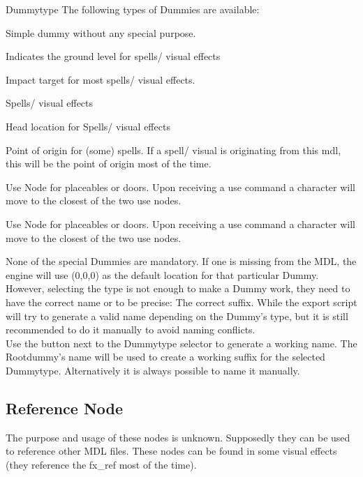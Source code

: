 \begin{propertyAurora}{Dummytype}
The following types of Dummies are available:
\begin{description}[leftmargin=6em,style=nextline]
    \item[None] Simple dummy without any special purpose.
    \item[Ground] Indicates the ground level for spells/ visual effects
    \item[Impact] Impact target for most spells/ visual effects.
    \item[Head Hit] Spells/ visual effects
    \item[Head] Head location for Spells/ visual effects
    \item[Hand] Point of origin for (some) spells. If a spell/ visual is originating from this mdl, this will be the point of origin most of the time.
    \item[Use 1] Use Node for placeables or doors. Upon receiving a use command a character will move to the closest of the two use nodes.
    \item[Use 2] Use Node for placeables or doors. Upon receiving a use command a character will move to the closest of the two use nodes.
\end{description}
\end{propertyAurora}
None of the special Dummies are mandatory. If one is
missing from the MDL, the engine will use (0,0,0) as the default location
for that particular Dummy. However, selecting the type 
is not enough to make a Dummy work, they need to have the correct name or to 
be precise: The correct suffix. While the export script will try to generate a 
valid name depending on the Dummy's type, but it is still recommended to do it 
manually to avoid naming conflicts. \\

Use the button next to the Dummytype selector to generate a
working name. The Rootdummy's name will be used to create a working
suffix for the selected Dummytype. Alternatively it is always possible to name 
it manually.

\subsection{Reference Node}
The purpose and usage of these nodes is unknown. Supposedly they can be used to
reference other MDL files. These nodes can be found in some visual effects (they reference 
the fx\_ref most of the time).

